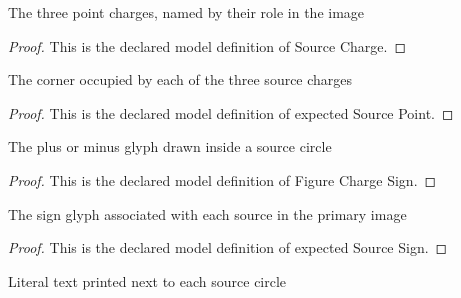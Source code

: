 \begin{definition}
  \label{def:physics:phyx-mini-0860:phyxminiproblems-problemphyxmini0860-sourcecharge}
  The three point charges, named by their role in the image
\end{definition}
\begin{proof}
  This is the declared model definition of Source Charge.
\end{proof}
\begin{definition}
  \label{def:physics:phyx-mini-0860:phyxminiproblems-problemphyxmini0860-expectedsourcepoint}
  The corner occupied by each of the three source charges
\end{definition}
\begin{proof}
  This is the declared model definition of expected Source Point.
\end{proof}
\begin{definition}
  \label{def:physics:phyx-mini-0860:phyxminiproblems-problemphyxmini0860-figurechargesign}
  The plus or minus glyph drawn inside a source circle
\end{definition}
\begin{proof}
  This is the declared model definition of Figure Charge Sign.
\end{proof}
\begin{definition}
  \label{def:physics:phyx-mini-0860:phyxminiproblems-problemphyxmini0860-expectedsourcesign}
  The sign glyph associated with each source in the primary image
\end{definition}
\begin{proof}
  This is the declared model definition of expected Source Sign.
\end{proof}
\begin{definition}
  \label{def:physics:phyx-mini-0860:phyxminiproblems-problemphyxmini0860-expectedprintedchargetext}
  Literal text printed next to each source circle
\end{definition}
